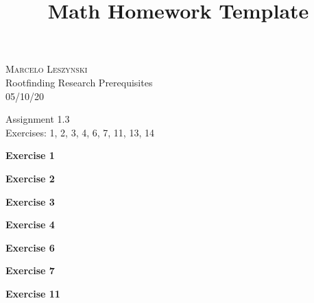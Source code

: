 \documentclass[12pt,oneside]{article}
\newenvironment{exercise}[1]{\vspace{.1in}\noindent\textbf{Exercise #1 \hspace{.05em}}}{}
\begin{document}
\title{Math Homework Template}

\begin{flushright}
\textsc{Marcelo Leszynski}  \\
Rootfinding Research Prerequisites \\
05/10/20
\end{flushright}

\begin{center}
\textsf{Assignment 1.3 } \\
\textsf{Exercises: 1, 2, 3, 4, 6, 7, 11, 13, 14}
\end{center}


\begin{exercise}{1}

\end{exercise}


\begin{exercise}{2}

\end{exercise}


\begin{exercise}{3}

\end{exercise}


\begin{exercise}{4}

\end{exercise}


\begin{exercise}{6}

\end{exercise}


\begin{exercise}{7}

\end{exercise}


\begin{exercise}{11}

\end{exercise}
\end{document}
